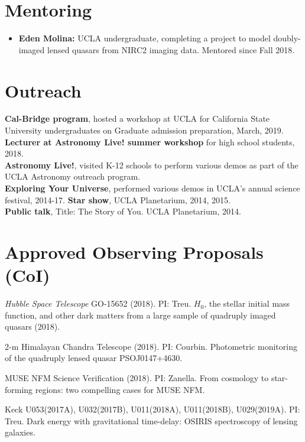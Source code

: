 \documentclass[margin, line]{res}
\begin{document}
\begin{resume}
\section{\sc Mentoring}
\begin{itemize}
	\item \textbf{Eden Molina:} UCLA undergraduate, completing a project to model doubly-imaged lensed quasars from NIRC2 imaging data. Mentored since Fall 2018.
\end{itemize}

\section{\sc Outreach}
{\bf Cal-Bridge program}, hosted a workshop at UCLA for California State University undergraduates on Graduate admission preparation, March, 2019. \\
{\bf Lecturer at Astronomy Live! summer workshop} for high school students, 2018. \\
{\bf Astronomy Live!}, visited K-12 schools to perform various demos as part of the UCLA Astronomy outreach program. \\
{\bf Exploring Your Universe}, performed various demos in UCLA's annual science festival, 2014-17.
{\bf Star show}, UCLA Planetarium, 2014, 2015. \\
{\bf Public talk}, Title: The Story of You. UCLA Planetarium, 2014. \\

\section{\sc Approved Observing Proposals (CoI)}
\begin{etaremune}
\item \textit{Hubble Space Telescope} GO-15652 (2018). PI: Treu. $H_0$, the stellar initial mass function, and other dark matters from a large sample of quadruply imaged quasars (2018).
\item 2-m Himalayan Chandra Telescope (2018). PI: Courbin. Photometric monitoring of the quadruply lensed quasar PSOJ0147+4630.
\item MUSE NFM Science Verification (2018). PI: Zanella. From cosmology to star-forming regions: two compelling cases for MUSE NFM.
\item Keck U053(2017A), U032(2017B), U011(2018A),  U011(2018B), U029(2019A). PI: Treu. Dark energy with gravitational time-delay: OSIRIS spectroscopy of lensing galaxies.
\end{etaremune}



\end{resume}
\end{document}
